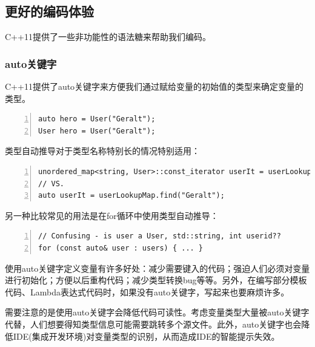 \documentclass{ctexart}
\begin{document}
\subsection{更好的编码体验}

C++11提供了一些非功能性的语法糖来帮助我们编码。

\subsubsection{auto关键字}

C++11提供了auto关键字来方便我们通过赋给变量的初始值的类型来确定变量的类型。

\begin{lstlisting}[language={[ANSI]C},keywordstyle=\color{blue!70},commentstyle=\color{red!50!green!50!blue!50},frame=shadowbox, rulesepcolor=\color{red!20!green!20!blue!20},basicstyle=\small,numbers=left, numberstyle=\tiny,breaklines=true]
auto hero = User("Geralt");  
User hero = User("Geralt");
\end{lstlisting}

类型自动推导对于类型名称特别长的情况特别适用：

\begin{lstlisting}[language={[ANSI]C},keywordstyle=\color{blue!70},commentstyle=\color{red!50!green!50!blue!50},frame=shadowbox, rulesepcolor=\color{red!20!green!20!blue!20},basicstyle=\small,numbers=left, numberstyle=\tiny,breaklines=true]
unordered_map<string, User>::const_iterator userIt = userLookupMap.find("Geralt");  
// VS.
auto userIt = userLookupMap.find("Geralt");
\end{lstlisting}

另一种比较常见的用法是在for循环中使用类型自动推导：

\begin{lstlisting}[language={[ANSI]C},keywordstyle=\color{blue!70},commentstyle=\color{red!50!green!50!blue!50},frame=shadowbox, rulesepcolor=\color{red!20!green!20!blue!20},basicstyle=\small,numbers=left, numberstyle=\tiny,breaklines=true]
// Confusing - is user a User, std::string, int userid??
for (const auto& user : users) { ... }
\end{lstlisting}

使用auto关键字定义变量有许多好处：减少需要键入的代码；强迫人们必须对变量进行初始化；方便以后重构代码；减少类型转换bug等等。另外，在编写部分模板代码、Lambda表达式代码时，如果没有auto关键字，写起来也要麻烦许多。

需要注意的是使用auto关键字会降低代码可读性。考虑变量类型大量被auto关键字代替，人们想要得知类型信息可能需要跳转多个源文件。此外，auto关键字也会降低IDE(集成开发环境)对变量类型的识别，从而造成IDE的智能提示失效。
\end{document}
